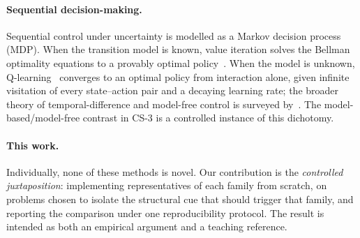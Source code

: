 \documentclass[10pt]{article}
\let\akparagraph\paragraph
\renewcommand{\paragraph}[1]{\Needspace*{4\baselineskip}\akparagraph{#1}}
\begin{document}
\paragraph{Sequential decision-making.}
Sequential control under uncertainty is modelled as a Markov decision process
(MDP). When the transition model is known, value iteration solves the Bellman
optimality equations to a provably optimal policy~\cite{bellman1957,puterman1994}.
When the model is unknown, Q-learning~\cite{watkins1992} converges to an optimal
policy from interaction alone, given infinite visitation of every state--action
pair and a decaying learning rate; the broader theory of temporal-difference and model-free
control is surveyed by~\cite{sutton2018}. The model-based/model-free contrast in
CS-3 is a controlled instance of this dichotomy.

\paragraph{This work.}
Individually, none of these methods is novel. Our contribution is the
\emph{controlled juxtaposition}: implementing representatives of each family from
scratch, on problems chosen to isolate the structural cue that should trigger
that family, and reporting the comparison under one reproducibility protocol.
The result is intended as both an empirical argument and a teaching reference.

\end{document}
